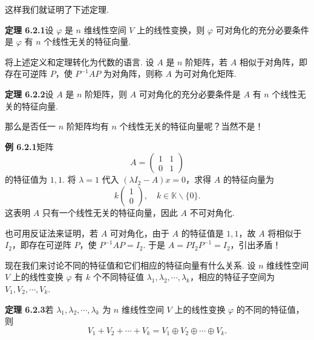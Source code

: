 \documentclass[UTF8,12pt,a4paper,fontset=fandol]{ctexart}
\begin{document}
这样我们就证明了下述定理.

\noindent\textbf{定理 6.2.1}\quad 设 $\varphi$ 是 $n$ 维线性空间 $V$ 上的线性变换，则 $\varphi$ 可对角化的充分必要条件是 $\varphi$ 有 $n$ 个线性无关的特征向量.

将上述定义和定理转化为代数的语言. 设 $A$ 是 $n$ 阶矩阵，若 $A$ 相似于对角阵，即存在可逆阵 $P$，使 $P^{-1}AP$ 为对角阵，则称 $A$ 为可对角化矩阵.

\noindent\textbf{定理 6.2.2}\quad 设 $A$ 是 $n$ 阶矩阵，则 $A$ 可对角化的充分必要条件是 $A$ 有 $n$ 个线性无关的特征向量.

那么是否任一 $n$ 阶矩阵均有 $n$ 个线性无关的特征向量呢？当然不是！

\noindent\textbf{例 6.2.1}\quad 矩阵
\[
A=\left(\begin{array}{cc}
1 & 1\\
0 & 1
\end{array}\right)
\]
的特征值为 $1,1$. 将 $\lambda=1$ 代入 $(\lambda I_2-A)x=0$，求得 $A$ 的特征向量为
\[
k\left(\begin{array}{c}
1\\
0
\end{array}\right),\quad k\in\mathbb{K}\backslash\{0\}.
\]
这表明 $A$ 只有一个线性无关的特征向量，因此 $A$ 不可对角化.

也可用反证法来证明，若 $A$ 可对角化，由于 $A$ 的特征值是 $1,1$，故 $A$ 将相似于 $I_2$，即存在可逆阵 $P$，使 $P^{-1}AP=I_2$. 于是 $A=PI_2P^{-1}=I_2$，引出矛盾！

现在我们来讨论不同的特征值和它们相应的特征向量有什么关系. 设 $n$ 维线性空间 $V$ 上的线性变换 $\varphi$ 有 $k$ 个不同特征值 $\lambda_1,\lambda_2,\cdots,\lambda_k$，相应的特征子空间为 $V_1,V_2,\cdots,V_k$.

\noindent\textbf{定理 6.2.3}\quad 若 $\lambda_1,\lambda_2,\cdots,\lambda_k$ 为 $n$ 维线性空间 $V$ 上的线性变换 $\varphi$ 的不同的特征值，则
\[
V_1+V_2+\cdots+V_k=V_1\oplus V_2\oplus\cdots\oplus V_k.
\]
\end{document}
